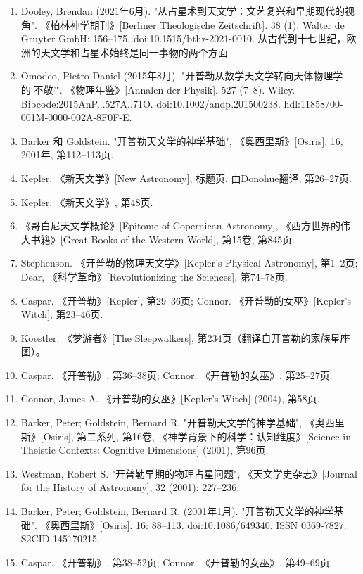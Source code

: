 \begin{enumerate}
\item Dooley, Brendan (2021年6月). "从占星术到天文学：文艺复兴和早期现代的视角". 《柏林神学期刊》[Berliner Theologische Zeitschrift]. 38 (1). Walter de Gruyter GmbH: 156–175. doi:10.1515/bthz-2021-0010. 从古代到十七世纪，欧洲的天文学和占星术始终是同一事物的两个方面
\item Omodeo, Pietro Daniel (2015年8月). "开普勒从数学天文学转向天体物理学的‘不敬’". 《物理年鉴》[Annalen der Physik]. 527 (7–8). Wiley. Bibcode:2015AnP...527A..71O. doi:10.1002/andp.201500238. hdl:11858/00-001M-0000-002A-8F0F-E.
\item Barker 和 Goldstein. "开普勒天文学的神学基础", 《奥西里斯》[Osiris], 16, 2001年, 第112–113页.
\item Kepler. 《新天文学》[New Astronomy], 标题页, 由Donohue翻译, 第26–27页.
\item Kepler. 《新天文学》, 第48页.
\item 《哥白尼天文学概论》[Epitome of Copernican Astronomy], 《西方世界的伟大书籍》[Great Books of the Western World], 第15卷, 第845页.
\item Stephenson. 《开普勒的物理天文学》[Kepler's Physical Astronomy], 第1–2页; Dear, 《科学革命》[Revolutionizing the Sciences], 第74–78页.
\item Caspar. 《开普勒》[Kepler], 第29–36页; Connor. 《开普勒的女巫》[Kepler's Witch], 第23–46页.
\item Koestler. 《梦游者》[The Sleepwalkers], 第234页（翻译自开普勒的家族星座图）。
\item Caspar. 《开普勒》, 第36–38页; Connor. 《开普勒的女巫》, 第25–27页.
\item Connor, James A. 《开普勒的女巫》[Kepler's Witch] (2004), 第58页.
\item Barker, Peter; Goldstein, Bernard R. "开普勒天文学的神学基础", 《奥西里斯》[Osiris], 第二系列, 第16卷, 《神学背景下的科学：认知维度》[Science in Theistic Contexts: Cognitive Dimensions] (2001), 第96页.
\item Westman, Robert S. "开普勒早期的物理占星问题", 《天文学史杂志》[Journal for the History of Astronomy], 32 (2001): 227–236.
\item Barker, Peter; Goldstein, Bernard R. (2001年1月). "开普勒天文学的神学基础". 《奥西里斯》[Osiris]. 16: 88–113. doi:10.1086/649340. ISSN 0369-7827. S2CID 145170215.
\item Caspar. 《开普勒》, 第38–52页; Connor. 《开普勒的女巫》, 第49–69页.
\end{enumerate}